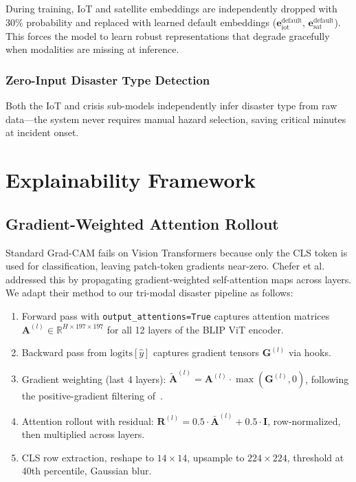 \documentclass[journal]{IEEEtran}
\begin{document}
During training, IoT and satellite embeddings are independently dropped with 30\% probability and replaced with learned default embeddings ($\mathbf{e}_\text{iot}^\text{default}$, $\mathbf{e}_\text{sat}^\text{default}$). This forces the model to learn robust representations that degrade gracefully when modalities are missing at inference.

\subsubsection{Zero-Input Disaster Type Detection}

Both the IoT and crisis sub-models independently infer disaster type from raw data---the system never requires manual hazard selection, saving critical minutes at incident onset.

\section{Explainability Framework}

\subsection{Gradient-Weighted Attention Rollout}

Standard Grad-CAM fails on Vision Transformers because only the CLS token is used for classification, leaving patch-token gradients near-zero. Chefer et al.~\cite{chefer2021transformer} addressed this by propagating gradient-weighted self-attention maps across layers. We adapt their method to our tri-modal disaster pipeline as follows:

\begin{enumerate}
    \item Forward pass with \texttt{output\_attentions=True} captures attention matrices $\mathbf{A}^{(l)} \in \mathbb{R}^{H \times 197 \times 197}$ for all 12 layers of the BLIP ViT encoder.
    \item Backward pass from $\text{logits}[\hat{y}]$ captures gradient tensors $\mathbf{G}^{(l)}$ via hooks.
    \item Gradient weighting (last 4 layers): $\tilde{\mathbf{A}}^{(l)} = \mathbf{A}^{(l)} \cdot \max(\mathbf{G}^{(l)}, 0)$, following the positive-gradient filtering of~\cite{chefer2021transformer}.
    \item Attention rollout with residual: $\mathbf{R}^{(l)} = 0.5 \cdot \bar{\mathbf{A}}^{(l)} + 0.5 \cdot \mathbf{I}$, row-normalized, then multiplied across layers.
    \item CLS row extraction, reshape to $14 \times 14$, upsample to $224 \times 224$, threshold at 40th percentile, Gaussian blur.
\end{enumerate}
\end{document}
